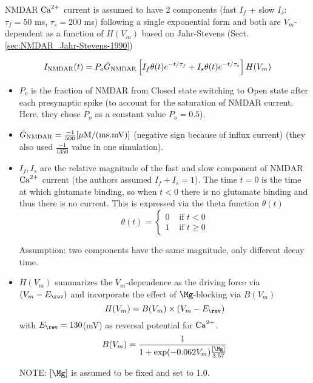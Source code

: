 NMDAR ${\text{Ca}^{2+}}$ current is assumed to have 2 components (fast $I_f$ + slow $I_s$:
$\tau_f = 50$ ms, $\tau_s = 200$ ms) following a single exponential form and
both are $V_m$-dependent as a function of $H(V_m)$ based on Jahr-Stevens
(Sect.\ref{sec:NMDAR_Jahr-Stevens-1990})


\begin{equation}
I_{\text{NMDAR}}(t) = P_o \bar{G}_{\text{NMDAR}} \left[   I_f \theta(t) e^{-t/\tau_f} +   I_s
\theta(t) e^{-t/\tau_s}\right] H(V_m)
\end{equation}
\begin{itemize}
  \item $P_o$ is the fraction of NMDAR from Closed state switching to Open state after
each presynaptic spike (to account for the saturation of NMDAR current. Here,
they chose $P_o$ as a constant value $P_o=0.5$).

  \item $\bar{G}_{\text{NMDAR}} = \frac{-1}{500} [{\mu\text{M}}/(\text{ms.mV})]$ (negative sign
  because of influx current) (they also used $\frac{-1}{1350}$ value in one simulation).

  \item $I_f,I_s$ are the relative magnitude of the fast and slow component of
NMDAR ${\text{Ca}^{2+}}$ current (the authors assumed $I_f + I_s = 1$). 
The time $t=0$ is the time at which glutamate binding, so when $t<0$ there is no
glutamate binding and thus there is no current. This is expressed via the theta
function $\theta(t)$
\begin{equation}
\theta(t) = \left\{ \begin{array}{lc}
0 & \text{ if } t< 0 \\
1 & \text{ if } t\ge 0 
\end{array} \right.
\end{equation}

Assumption: two components have the same magnitude, only different decay time.

  \item $H(V_m)$ summarizes the $V_m$-dependence as the driving force via
  $(V_m-E_\rev)$ and incorporate the effect of $\Mg$-blocking via $B(V_m)$
\begin{equation}
H(V_m) = B(V_m) \times \left( V_m - E_\rev \right)
\end{equation}
with $E_\rev=130 $(mV) as reversal potential for ${\text{Ca}^{2+}}$.
\begin{equation}
B(V_m) = \frac{1}{1+\exp(-0.062 V_m)\frac{[\Mg]}{3.57}}
\end{equation}

NOTE: $[\Mg]$ is assumed to be fixed and set to 1.0.

\end{itemize}

